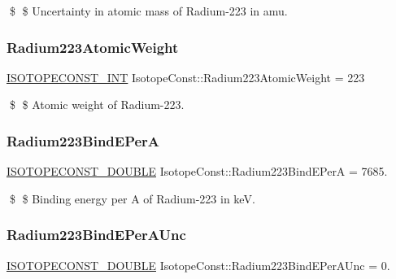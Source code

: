 \$ \$ Uncertainty in atomic mass of Radium-\/223 in amu. \mbox{\label{group___isotope_const-_radium-_ra223_ga7f73cae8e855098ef6835fd7ee9fab15}} 
\subsubsection{\texorpdfstring{Radium223\+Atomic\+Weight}{Radium223AtomicWeight}}
{\footnotesize\ttfamily \mbox{\hyperlink{group___isotope_const-_macros_ga5f18360b3e99483a35c32d789e62621c}{I\+S\+O\+T\+O\+P\+E\+C\+O\+N\+S\+T\+\_\+\+I\+NT}} Isotope\+Const\+::\+Radium223\+Atomic\+Weight = 223}

\$ \$ Atomic weight of Radium-\/223. \mbox{\label{group___isotope_const-_radium-_ra223_gae7461b76338eb1401cdb099d2fdd9787}} 
\subsubsection{\texorpdfstring{Radium223\+Bind\+E\+PerA}{Radium223BindEPerA}}
{\footnotesize\ttfamily \mbox{\hyperlink{group___isotope_const-_macros_ga8f45a7272ce02c0b4c65c44636ed719a}{I\+S\+O\+T\+O\+P\+E\+C\+O\+N\+S\+T\+\_\+\+D\+O\+U\+B\+LE}} Isotope\+Const\+::\+Radium223\+Bind\+E\+PerA = 7685.}

\$ \$ Binding energy per A of Radium-\/223 in keV. \mbox{\label{group___isotope_const-_radium-_ra223_ga77a0e62b7e118319ffc9c76bc7421ceb}} 
\subsubsection{\texorpdfstring{Radium223\+Bind\+E\+Per\+A\+Unc}{Radium223BindEPerAUnc}}
{\footnotesize\ttfamily \mbox{\hyperlink{group___isotope_const-_macros_ga8f45a7272ce02c0b4c65c44636ed719a}{I\+S\+O\+T\+O\+P\+E\+C\+O\+N\+S\+T\+\_\+\+D\+O\+U\+B\+LE}} Isotope\+Const\+::\+Radium223\+Bind\+E\+Per\+A\+Unc = 0.}


